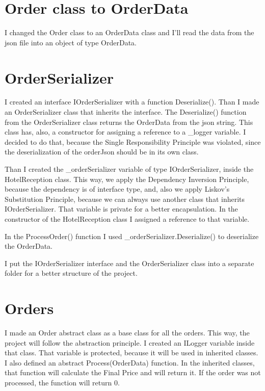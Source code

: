 \documentclass[12pt, a4paper]{scrartcl}
\begin{document}
\section{Order class to OrderData}

I changed the Order class to an OrderData class and I'll read the data 
from the json file into an object of type OrderData.

\section{OrderSerializer}

I created an interface IOrderSerializer with a function Deserialize(). Than 
I made an OrderSerializer class that inherits the interface. The 
Deserialize() function from the OrderSerializer class returns the 
OrderData from the json string. This class has, also, a constructor 
for assigning a reference to a \_logger variable. 
I decided to do that, because 
the Single Responsibility Principle was violated, since the 
deserialization of the orderJson should be in its own class.

Than I created the \_orderSerializer variable of type IOrderSerializer, 
inside the HotelReception 
class. This way, we apply the Dependency Inversion Principle,
because the dependency is of interface type, and, also we apply
Liskov's Substitution Principle, 
because we can always use another class that inherits IOrderSerializer.
That variable is private for a better encapsulation.
In the constructor of the HotelReception class I assigned a 
reference to that variable.

In the ProcessOrder() function I used \_orderSerializer.Deserialize() 
to deserialize the OrderData.

I put the IOrderSerializer interface and the OrderSerializer class into a 
separate folder for a better structure of the project.

\section{Orders}

I made an Order abstract class as a base class for all the orders. This way,
the project will follow the abstraction principle. I created 
an ILogger variable inside that class. That variable is protected, because 
it will be used in inherited classes. I also defined an abstract Process(OrderData) function.
In the inherited classes, that function will calculate the Final Price and will return it.
If the order was not processed, the function will return 0. 
\end{document}
